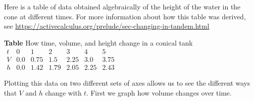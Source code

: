 \documentclass{ximera}
\begin{document}


Here is a table of data obtained algebraically of the height of the water in the cone at different times.  For more information about how this table was derived, see \url{https://activecalculus.org/prelude/sec-changing-in-tandem.html}

\begin{center}
\textbf{Table} How time, volume, and height change in a conical tank
\(
\begin{array}{lllllll}
t&0&1&2&3&4&5\\
\hline
V&0.0&0.75&1.5&2.25&3.0&3.75\\
\hline
h&0.0&1.42&1.79&2.05&2.25&2.43
\end{array}
\)
\end{center}


Plotting this data on two different sets of axes allows us to see the different ways that \(V\) and \(h\) change with \(t\).  First we graph how volume changes over time.
\end{document}
